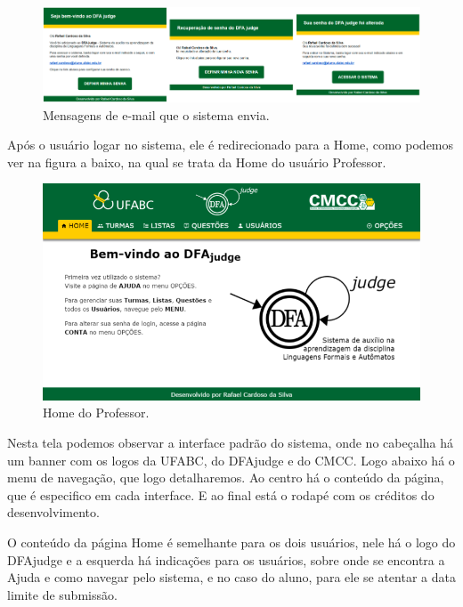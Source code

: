 \documentclass[
	12pt,				%
	openany,
	oneside,
	a4paper,			%
	english,			%
	brazil				%
	]{abntex2}
\begin{document}
\begin{figure}[H]
  \centering
  \includegraphics[width=\textwidth]{prints/emails.png}
  \caption{Mensagens de e-mail que o sistema envia.}
  \label{print:emails}
  \vspace{-0.5cm}
\end{figure}

  Após o usuário logar no sistema, ele é redirecionado para a Home, como podemos ver na figura a baixo, na qual se trata da Home do usuário Professor.
  
\begin{figure}[H]
  \centering
  \includegraphics[width=\textwidth]{prints/profHome.png}
  \caption{Home do Professor.}
  \label{print:profHome}
  \vspace{-0.5cm}
\end{figure}

  Nesta tela podemos observar a interface padrão do sistema, onde no cabeçalha há um banner com os logos da UFABC, do DFAjudge e do CMCC. Logo abaixo há o menu de navegação, que logo detalharemos. Ao centro há o conteúdo da página, que é especifico em cada interface. E ao final está o rodapé com os créditos do desenvolvimento.
  
   O conteúdo da página Home é semelhante para os dois usuários, nele há o logo do DFAjudge e a esquerda há indicações para os usuários, sobre onde se encontra a Ajuda e como navegar pelo sistema, e no caso do aluno, para ele se atentar a data limite de submissão.
\end{document}
